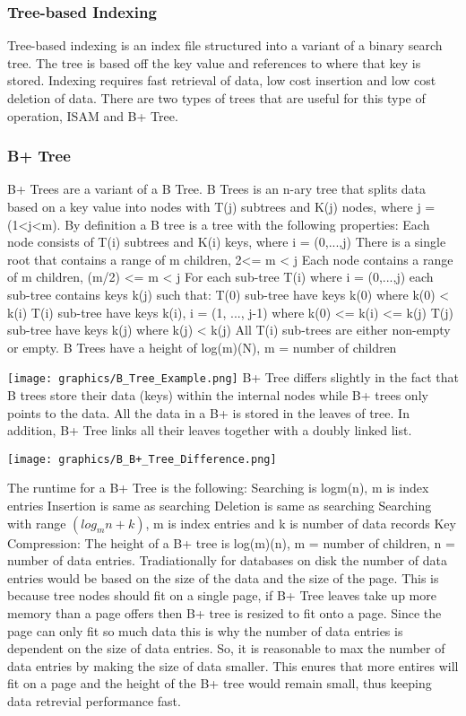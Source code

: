 \documentclass[letterpaper, 12pt]{article}
\begin{document}
\subsubsection{Tree-based Indexing}
Tree-based indexing is an index file structured into a variant of a binary search tree. The tree is based off
the key value and references to where that key is stored. Indexing requires fast retrieval of data, low cost
insertion and low cost deletion of data. There are two types of trees that are useful for this type of operation,
ISAM and B+ Tree.

\subsubsection{B+ Tree}
B+ Trees are a variant of a B Tree. B Trees is an n-ary tree that splits data
	based on a key value into nodes with T(j) subtrees and K(j) nodes, where j = (1<j<m).
	By definition a B tree is a tree with the following properties:
	Each node consists of T(i) subtrees and K(i) keys, where i = (0,...,j)
	There is a single root that contains a range of m children, 2<= m < j
	Each node contains a range of m children, (m/2) <= m < j
	For each sub-tree T(i) where i = (0,...,j) each sub-tree contains keys k(j) such that:
		T(0) sub-tree have keys k(0) where k(0) < k(i)
		T(i) sub-tree have keys k(i), i = (1, ..., j-1) where k(0) <= k(i) <= k(j)
		T(j) sub-tree have keys k(j) where k(j) < k(j)
	All T(i) sub-trees are either non-empty or empty.
	B Trees have a height of log(m)(N), m = number of children

\texttt{[image: graphics/B\_Tree\_Example.png]}
\cite{b+tree}
B+ Tree differs slightly in the fact that B trees store their data (keys) within the internal nodes while
B+ trees only points to the data. All the data in a B+ is stored in the leaves of tree. In addition,
B+ Tree links all their leaves together with a doubly linked list.

\texttt{[image: graphics/B\_B+\_Tree\_Difference.png]}
\cite{btree}

The runtime for a B+ Tree is the following:
Searching is logm(n), m is index entries
Insertion is same as searching
Deletion is same as searching
Searching with range $( log_m n + k) $, m is index entries and k is number of data records
Key Compression:
The height of a B+ tree is log(m)(n), m = number of children, n = number of data entries.
Tradiationally for databases on disk the number of data entries would be based on the size of the data and
the size of the page. This is because tree nodes should fit on a single page, if B+ Tree leaves take up more
memory than a page offers then B+ tree is resized to fit onto a page. Since the page can only fit so much
data this is why the number of data entries is dependent on the size of data entries. So, it is reasonable
to max the number of data entries by making the size of data smaller. This enures that more entires will
fit on a page and the height of the B+ tree would remain small, thus keeping data retrevial performance fast.
\end{document}
